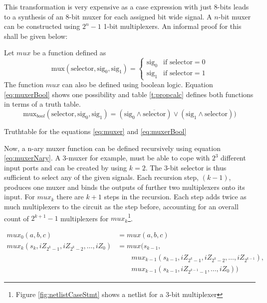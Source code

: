 This transformation is very expensive as a case expression with just
8-bits leads to a synthesis of an 8-bit muxer for each assigned bit
wide signal. A \(n\)-bit muxer can be constructed using \(2^n-1\) 1-bit multiplexers.
An informal proof for this shall be given below:

Let \(mux\) be a function defined as
%
\begin{equation}
  \label{eq:muxer}
\text{mux}(\text{selector}, \text{sig}_0, \text{sig}_1) =
\begin{cases}
    \text{sig}_0 & \text{if } \text{selector} = 0 \\
    \text{sig}_1 & \text{if } \text{selector} = 1
\end{cases}
\end{equation}
%
The function \(mux\) can also be defined using boolean logic. Equation
\ref{eq:muxerBool} shows one possibility and table \ref{t:propcalc}
defines both functions in terms of a truth table.
%
\begin{equation}
    \label{eq:muxerBool}
    \text{mux}_{bool}(\text{selector}, \text{sig}_0, \text{sig}_1) =
    (\text{sig}_0 \land \overline{\text{selector}})
    \lor (\text{sig}_1 \land \text{selector}))
\end{equation}
%
\begin{table}[b]
\centering
\caption[Truthtable]{Truthtable for the equations
  \ref{eq:muxer} and \ref{eq:muxerBool}}

\label{t:propcalc}
\end{table}
%
Now, a n-ary muxer function can be defined recursively using equation
\ref{eq:muxerNary}.
A 3-muxer for example, must be able to cope with \(2^3\) different
input ports and can be created by using \(k = 2\). The
3-bit selector is thus sufficient to select any of the given
signals. Each recursion step, \((k-1)\), produces one muxer and binds the
outputs of further two multiplexers onto its input. For \(mux_k\)
there are \(k+1\) steps in the recursion. Each step adds twice as much
multiplexers to the circuit as the step before, accounting for an
overall count of \(2^{k+1}-1\) multiplexers for
\(mux_k\)\footnote{Figure \ref{fig:netlistCaseStmt} shows a netlist
  for a 3-bit multiplexer}.

\begin{equation}
    \label{eq:muxerNary}
    \begin{aligned}
        mux_0(a, b, c) &=  mux(a, b, c) \\
        mux_k(s_k, iZ_{2^k-1}, iZ_{2^k-2}, \ldots, iZ_{0}) &=
        mux(s_{k-1}, \\
        &\qquad mux_{k-1}(s_{k-1}, iZ_{2^k-1}, iZ_{2^k-2}, \ldots,
        iZ_{2^{k-1}}), \\
        &\qquad mux_{k-1}(s_{k-1}, iZ_{2^{k-1}-1}, \ldots, iZ_{0}))
  \end{aligned}
\end{equation}

